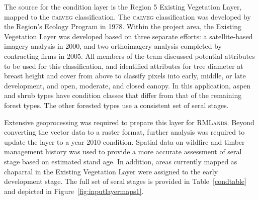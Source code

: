 The source for the condition layer is the Region 5 Existing Vegetation Layer, mapped to the \textsc{calveg} classification. The \textsc{calveg} classification was developed by the Region's Ecology Program in 1978. Within the project area, the Existing Vegetation Layer was developed based on three separate efforts: a satellite-based imagery analysis in 2000, and two orthoimagery analysis completed by contracting firms in 2005. All members of the team discussed potential attributes to be used for this classification, and identified attributes for tree diameter at breast height and cover from above to classify pixels into early, middle, or late development, and open, moderate, and closed canopy. In this application, aspen and shrub types have condition classes that differ from that of the remaining forest types. The other forested types use a consistent set of seral stages.

Extensive geoprocessing was required to prepare this layer for \textsc{RMLands}. Beyond converting the vector data to a raster format, further analysis was required to update the layer to a year 2010 condition. Spatial data on wildfire and timber management history was used to provide a more accurate assessment of seral stage based on estimated stand age. In addition, areas currently mapped as chaparral in the Existing Vegetation Layer were assigned to the early development stage. The full set of seral stages is provided in Table~\ref{condtable} and depicted in Figure~\ref{fig:inputlayermaps1}.


